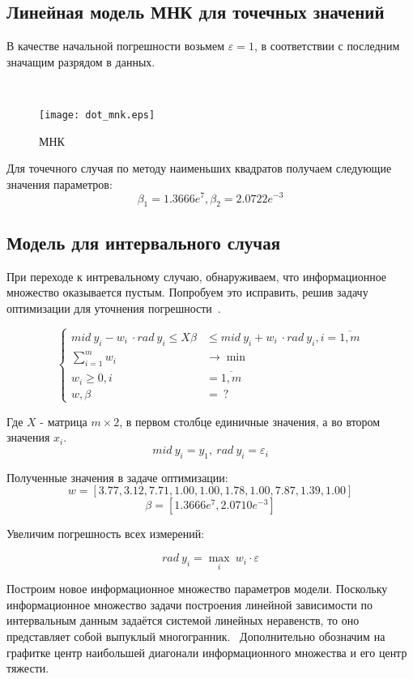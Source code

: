 \documentclass[a4paper,12pt]{article}
\begin{document}
\subsection{Линейная модель МНК для точечных значений}

В качестве начальной погрешности возьмем $\varepsilon = 1$, в соответствии с 
последним значащим разрядом в данных.

\begin{figure}[h!]~\label{fig4}
\centerline{\texttt{[image: dot\_mnk.eps]}}
\caption{МНК}
\end{figure}

Для точечного случая по методу наименьших квадратов получаем следующие
значения параметров:$$ \beta_1=1.3666e^7, \beta_2=2.0722e^{-3} $$

\subsection{Модель для интервального случая}

При переходе к интревальному случаю, обнаруживаем, что информационное множество
оказывается пустым.
Попробуем это исправить, решив задачу оптимизации для уточнения 
погрешности~\cite{baz}.

\begin{equation}
\left\{
\begin{aligned}
    mid~y_i - w_i~\cdot rad~y_i \leq X \beta &\leq mid~y_i + w_i~\cdot rad~y_i, 
    i = \overline{1, m} \\ 
    \sum\limits_{i=1}^m w_i &\rightarrow \min \\
    w_i \geq 0, i &= \overline{1, m}\\
    w, \beta &=~?
\end{aligned}
\end{equation}

Где $X$ - матрица $m \times 2$, в первом столбце единичные значения, а во 
втором значения $x_i$.
$$mid~y_i = y_1,~rad~y_i = \varepsilon_i$$

Полученные значения в задаче оптимизации:
\[
    w = [3.77, 3.12, 7.71, 1.00, 1.00, 1.78, 1.00, 7.87, 1.39, 1.00]
\]
\[
    \beta = [1.3666e^7, 2.0710e^{-3}]
\]

Увеличим погрешность всех измерений:

\[
    rad~y_i = \max\limits_i~w_i \cdot \varepsilon
\]

Построим новое информационное множество параметров модели. Поскольку
информационное множество задачи построения линейной зависимости по интервальным
данным задаётся системой линейных неравенств, то оно представляет собой 
выпуклый многогранник.~\cite{ex} Дополнительно обозначим на графитке центр наибольшей 
диагонали информационного множества и его центр тяжести.
\end{document}

